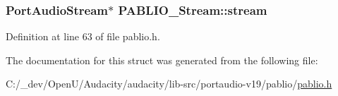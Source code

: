 \subsubsection[{\texorpdfstring{stream}{stream}}]{\setlength{\rightskip}{0pt plus 5cm}Port\+Audio\+Stream$\ast$ P\+A\+B\+L\+I\+O\+\_\+\+Stream\+::stream}\hypertarget{struct_p_a_b_l_i_o___stream_a39b571d723a0ca5f7b8350e81bb0e2e3}{}\label{struct_p_a_b_l_i_o___stream_a39b571d723a0ca5f7b8350e81bb0e2e3}


Definition at line 63 of file pablio.\+h.



The documentation for this struct was generated from the following file\+:\begin{DoxyCompactItemize}
\item 
C\+:/\+\_\+dev/\+Open\+U/\+Audacity/audacity/lib-\/src/portaudio-\/v19/pablio/\hyperlink{pablio_8h}{pablio.\+h}\end{DoxyCompactItemize}
